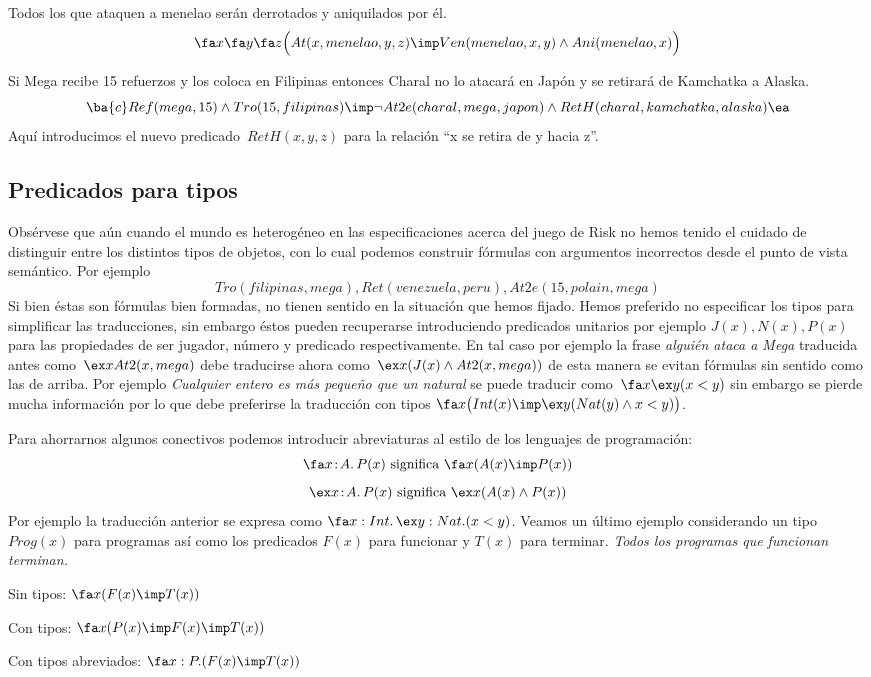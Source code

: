 \documentclass[11pt,letterpaper]{article}
\begin{document}
 \item Todos los que ataquen a menelao serán derrotados y aniquilados por él.
  \[
  \fa x \fa y\fa z\Big(At(x,menelao,y,z)\imp Ven(menelao,x,y)\land 
  Ani(menelao,x)\Big)
  \]

 \item Si Mega recibe 15 refuerzos y los coloca en Filipinas entonces
  Charal no lo atacará en Japón y se retirará de Kamchatka a Alaska.
  \[
  \ba{c}
  Ref(mega,15)\land Tro(15,filipinas)\imp \\
  \neg
  At2e(charal,mega,japon)\land RetH(charal,kamchatka,alaska)
  \ea
  \]
 Aquí introducimos el nuevo predicado~$RetH(x,y,z)$ para la relación
 \enquote{x se retira de y hacia z}.
\ei


\subsection{Predicados para tipos}

Obsérvese que aún cuando el mundo es heterog\'eneo en las especificaciones 
acerca del juego de Risk no hemos tenido el cuidado de distinguir entre los
distintos tipos de objetos, con lo cual podemos construir fórmulas con
argumentos incorrectos desde el punto de vista semántico. Por ejemplo
\[
Tro(filipinas,mega), Ret(venezuela,peru), At2e(15,polain, mega)
\]
Si bien éstas son fórmulas bien formadas, no tienen sentido en la situación que
hemos fijado. Hemos preferido no especificar los tipos para simplificar las
traducciones, sin embargo éstos pueden recuperarse introduciendo predicados
unitarios por ejemplo $J(x), N(x), P(x)$ para las propiedades de ser jugador,
número y predicado respectivamente. En tal caso por ejemplo la frase
\textit{alguién ataca a Mega} traducida antes como~$\ex x At2(x,mega)$
debe traducirse ahora como~$\ex x(J(x)\land At2(x,mega))$ de esta manera se
evitan fórmulas sin sentido como las de arriba. 
Por ejemplo \textit{Cualquier entero es más pequeño que un natural} se puede 
traducir como~$\fa x\ex y (x < y)$ sin embargo se pierde mucha información por
lo que debe preferirse la traducción con tipos
$\fa x\big(Int(x)\imp \ex y(Nat(y)\land x<y)\big)$. 

Para ahorrarnos algunos conectivos podemos introducir abreviaturas al
estilo de los lenguajes de programación:
\[
\fa x\!:\!A.\, P(x) \mbox{ significa }  \fa x (A(x)\imp P(x))
\]
\[
\ex x\!:\!A.\, P(x) \mbox{ significa }  \ex x (A(x)\land P(x))
\]
Por ejemplo la traducción anterior se expresa como 
$\fa x:Int.\,\ex y:Nat.(x<y)$.
Veamos un último ejemplo considerando un tipo~$Prog(x)$ para programas
así como los predicados $F(x)$ para funcionar y $T(x)$ para terminar.
\bc
\textit{Todos los programas que funcionan terminan.}
\ec
\bi
 \item Sin tipos: $\fa x (F(x)\imp T(x))$
 \item Con tipos: $\fa x (P(x)\imp F(x)\imp T(x))$
 \item Con tipos abreviados: $\fa x:P. (F(x)\imp T(x))$
\ei
\end{document}
